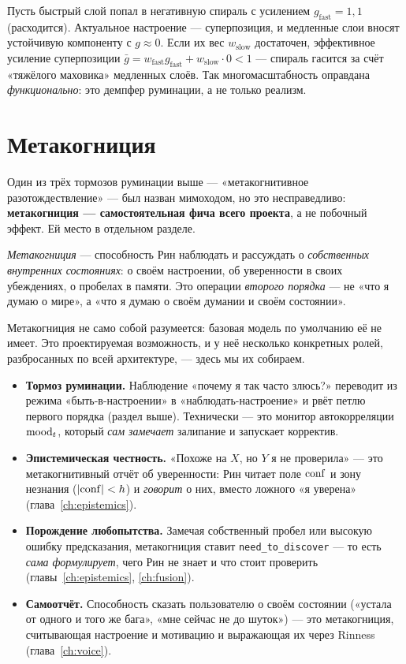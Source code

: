 \begin{workedbox}
Пусть быстрый слой попал в негативную спираль с усилением $g_{\text{fast}}=1{,}1$
(расходится). Актуальное настроение — суперпозиция, и медленные слои вносят
устойчивую компоненту с $g\approx 0$. Если их вес $w_{\text{slow}}$ достаточен,
эффективное усиление суперпозиции $\bar g=w_{\text{fast}}g_{\text{fast}}+w_{\text{slow}}\cdot 0<1$
— спираль гасится за счёт «тяжёлого маховика» медленных слоёв. Так многомасштабность
оправдана \emph{функционально}: это демпфер руминации, а не только реализм.
\end{workedbox}

\section{Метакогниция}
\label{sec:metacognition}

Один из трёх тормозов руминации выше — «метакогнитивное разотождествление» — был
назван мимоходом, но это несправедливо: \textbf{метакогниция — самостоятельная фича
всего проекта}, а не побочный эффект. Ей место в отдельном разделе.

\begin{definition}[Метакогниция]
\emph{Метакогниция} — способность Рин наблюдать и рассуждать о \emph{собственных
внутренних состояниях}: о своём настроении, об уверенности в своих убеждениях, о
пробелах в памяти. Это операции \emph{второго порядка} — не «что я думаю о мире», а
«что я думаю о своём думании и своём состоянии».
\end{definition}

Метакогниция не само собой разумеется: базовая модель по умолчанию её не имеет.
Это проектируемая возможность, и у неё несколько конкретных ролей, разбросанных по
всей архитектуре, — здесь мы их собираем.

\begin{itemize}\itemsep2pt
\item \textbf{Тормоз руминации.} Наблюдение «почему я так часто злюсь?» переводит
из режима «быть-в-настроении» в «наблюдать-настроение» и рвёт петлю первого порядка
(раздел выше). Технически — это монитор автокорреляции $\mathrm{mood}_t$, который \emph{сам
замечает} залипание и запускает корректив.
\item \textbf{Эпистемическая честность.} «Похоже на $X$, но $Y$ я не проверила» —
это метакогнитивный отчёт об уверенности: Рин читает поле $\mathrm{conf}$ и зону незнания
($|\mathrm{conf}|<h$) и \emph{говорит} о них, вместо ложного «я уверена»
(глава~\ref{ch:epistemics}).
\item \textbf{Порождение любопытства.} Замечая собственный пробел или высокую ошибку
предсказания, метакогниция ставит \texttt{need\_to\_discover} — то есть \emph{сама
формулирует}, чего Рин не знает и что стоит проверить (главы~\ref{ch:epistemics},
\ref{ch:fusion}).
\item \textbf{Самоотчёт.} Способность сказать пользователю о своём состоянии
(«устала от одного и того же бага», «мне сейчас не до шуток») — это метакогниция,
считывающая настроение и мотивацию и выражающая их через Rinness
(глава~\ref{ch:voice}).
\end{itemize}

